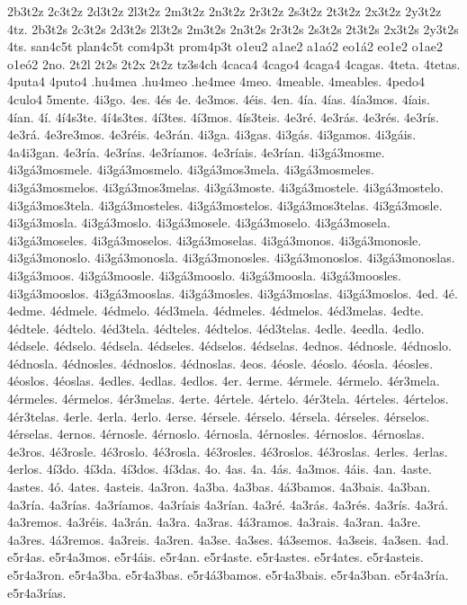 {2b3t2z 2c3t2z 2d3t2z 2l3t2z 2m3t2z 2n3t2z 2r3t2z 2s3t2z 2t3t2z 2x3t2z 2y3t2z 4tz.
2b3t2s 2c3t2s 2d3t2s 2l3t2s 2m3t2s 2n3t2s 2r3t2s 2s3t2s 2t3t2s 2x3t2s 2y3t2s 4ts.
san4c5t
plan4c5t
com4p3t
prom4p3t
o1eu2
a1ae2
a1aó2
eo1á2
eo1e2
o1ae2
o1eó2
2no.
2t2l
2t2s
2t2x
2t2z
tz3s4ch
4caca4
4cago4
4caga4
4cagas.
4teta.
4tetas.
4puta4
4puto4
.hu4mea
.hu4meo
.he4mee
4meo.
4meable.
4meables.
4pedo4
4culo4
5mente.
4i3go.
4es.
4és
4e.
4e3mos.
4éis.
4en.
4ía.
4ías.
4ía3mos.
4íais.
4ían.
4í.
4í4s3te.
4í4s3tes.
4í3tes.
4í3mos.
4ís3teis.
4e3ré.
4e3rás.
4e3rés.
4e3rís.
4e3rá.
4e3re3mos.
4e3réis.
4e3rán.
4i3ga.
4i3gas.
4i3gás.
4i3gamos.
4i3gáis.
4a4i3gan.
4e3ría.
4e3rías.
4e3ríamos.
4e3ríais.
4e3rían.
4i3gá3mosme.
4i3gá3mosmele.
4i3gá3mosmelo.
4i3gá3mos3mela.
4i3gá3mosmeles.
4i3gá3mosmelos.
4i3gá3mos3melas.
4i3gá3moste.
4i3gá3mostele.
4i3gá3mostelo.
4i3gá3mos3tela.
4i3gá3mosteles.
4i3gá3mostelos.
4i3gá3mos3telas.
4i3gá3mosle.
4i3gá3mosla.
4i3gá3moslo.
4i3gá3mosele.
4i3gá3moselo.
4i3gá3mosela.
4i3gá3moseles.
4i3gá3moselos.
4i3gá3moselas.
4i3gá3monos.
4i3gá3monosle.
4i3gá3monoslo.
4i3gá3monosla.
4i3gá3monosles.
4i3gá3monoslos.
4i3gá3monoslas.
4i3gá3moos.
4i3gá3moosle.
4i3gá3mooslo.
4i3gá3moosla.
4i3gá3moosles.
4i3gá3mooslos.
4i3gá3mooslas.
4i3gá3mosles.
4i3gá3moslas.
4i3gá3moslos.
4ed.
4é.
4edme.
4édmele.
4édmelo.
4éd3mela.
4édmeles.
4édmelos.
4éd3melas.
4edte.
4édtele.
4édtelo.
4éd3tela.
4édteles.
4édtelos.
4éd3telas.
4edle.
4eedla.
4edlo.
4édsele.
4édselo.
4édsela.
4édseles.
4édselos.
4édselas.
4ednos.
4édnosle.
4édnoslo.
4édnosla.
4édnosles.
4édnoslos.
4édnoslas.
4eos.
4éosle.
4éoslo.
4éosla.
4éosles.
4éoslos.
4éoslas.
4edles.
4edlas.
4edlos.
4er.
4erme.
4érmele.
4érmelo.
4ér3mela.
4érmeles.
4érmelos.
4ér3melas.
4erte.
4értele.
4értelo.
4ér3tela.
4érteles.
4értelos.
4ér3telas.
4erle.
4erla.
4erlo.
4erse.
4érsele.
4érselo.
4érsela.
4érseles.
4érselos.
4érselas.
4ernos.
4érnosle.
4érnoslo.
4érnosla.
4érnosles.
4érnoslos.
4érnoslas.
4e3ros.
4é3rosle.
4é3roslo.
4é3rosla.
4é3rosles.
4é3roslos.
4é3roslas.
4erles.
4erlas.
4erlos.
4í3do.
4í3da.
4í3dos.
4í3das.
4o.
4as.
4a.
4ás.
4a3mos.
4áis.
4an.
4aste.
4astes.
4ó.
4ates.
4asteis.
4a3ron.
4a3ba.
4a3bas.
4á3bamos.
4a3bais.
4a3ban.
4a3ría.
4a3rías.
4a3ríamos.
4a3ríais
4a3rían.
4a3ré.
4a3rás.
4a3rés.
4a3rís.
4a3rá.
4a3remos.
4a3réis.
4a3rán.
4a3ra.
4a3ras.
4á3ramos.
4a3rais.
4a3ran.
4a3re.
4a3res.
4á3remos.
4a3reis.
4a3ren.
4a3se.
4a3ses.
4á3semos.
4a3seis.
4a3sen.
4ad.
e5r4as.
e5r4a3mos.
e5r4áis.
e5r4an.
e5r4aste.
e5r4astes.
e5r4ates.
e5r4asteis.
e5r4a3ron.
e5r4a3ba.
e5r4a3bas.
e5r4á3bamos.
e5r4a3bais.
e5r4a3ban.
e5r4a3ría.
e5r4a3rías.
}
